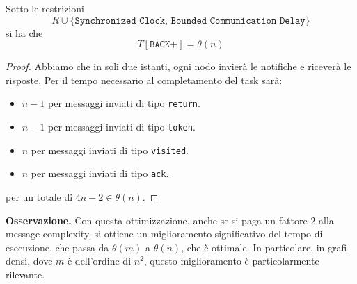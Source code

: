 \begin{teorema}
    Sotto le restrizioni 
    \[
    R \cup \{\texttt{Synchronized Clock, Bounded Communication Delay}\}
    \]
    si ha che
    \[
        T[\texttt{BACK+}] = \theta(n)
    \]
    \begin{proof}
        Abbiamo che in soli due istanti, ogni nodo invierà le notifiche e riceverà le risposte. Per il tempo necessario al completamento del task sarà:
        \begin{itemize}
            \item $n - 1$ per messaggi inviati di tipo \texttt{return}.
            \item $n - 1$ per messaggi inviati di tipo \texttt{token}.
            \item $n$ per messaggi inviati di tipo \texttt{visited}.
            \item $n$ per messaggi inviati di tipo \texttt{ack}.
        \end{itemize}
        per un totale di $4n - 2 \in \theta(n)$.
    \end{proof}
\end{teorema}

\textbf{Osservazione.} Con questa ottimizzazione, anche se si paga un fattore $2$ alla message complexity, si ottiene un miglioramento significativo del tempo di esecuzione, che passa da $\theta(m)$ a $\theta(n)$, che è ottimale. In particolare, in grafi densi, dove $m$ è dell'ordine di $n^2$, questo miglioramento è particolarmente rilevante.